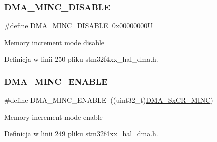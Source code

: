 \subsubsection{\texorpdfstring{D\+M\+A\+\_\+\+M\+I\+N\+C\+\_\+\+D\+I\+S\+A\+B\+LE}{DMA\_MINC\_DISABLE}}
{\footnotesize\ttfamily \#define D\+M\+A\+\_\+\+M\+I\+N\+C\+\_\+\+D\+I\+S\+A\+B\+LE~0x00000000U}

Memory increment mode disable 

Definicja w linii 250 pliku stm32f4xx\+\_\+hal\+\_\+dma.\+h.

\mbox{\label{group___d_m_a___memory__incremented__mode_ga43d30885699cc8378562316ff4fed1cd}} 
\subsubsection{\texorpdfstring{D\+M\+A\+\_\+\+M\+I\+N\+C\+\_\+\+E\+N\+A\+B\+LE}{DMA\_MINC\_ENABLE}}
{\footnotesize\ttfamily \#define D\+M\+A\+\_\+\+M\+I\+N\+C\+\_\+\+E\+N\+A\+B\+LE~((uint32\+\_\+t)\hyperlink{group___peripheral___registers___bits___definition_ga771a295832a584a3777ede523a691719}{D\+M\+A\+\_\+\+Sx\+C\+R\+\_\+\+M\+I\+NC})}

Memory increment mode enable 

Definicja w linii 249 pliku stm32f4xx\+\_\+hal\+\_\+dma.\+h.

